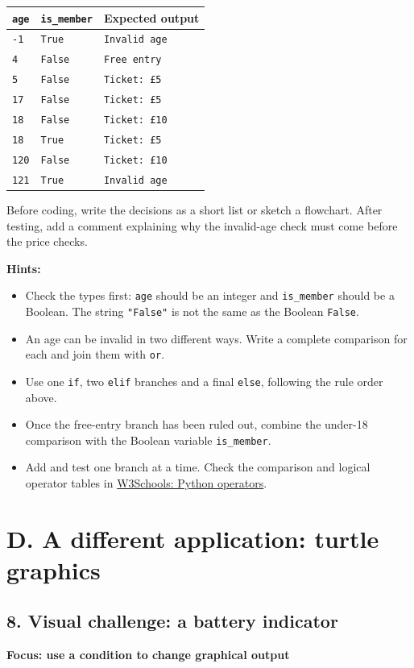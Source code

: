 \documentclass[12pt,a4paper]{article}
\begin{document}
\begingroup\small\renewcommand{\arraystretch}{1.3}\begin{longtable}{>{\raggedright\arraybackslash}p{}>{\raggedright\arraybackslash}p{}>{\raggedright\arraybackslash}p{}}
\toprule
\rowcolor{panel} \texttt{age} & \texttt{is\_member} & Expected output \\ \midrule\endhead
\texttt{-1} & \texttt{True} & \texttt{Invalid age} \\
\texttt{4} & \texttt{False} & \texttt{Free entry} \\
\texttt{5} & \texttt{False} & \texttt{Ticket: £5} \\
\texttt{17} & \texttt{False} & \texttt{Ticket: £5} \\
\texttt{18} & \texttt{False} & \texttt{Ticket: £10} \\
\texttt{18} & \texttt{True} & \texttt{Ticket: £5} \\
\texttt{120} & \texttt{False} & \texttt{Ticket: £10} \\
\texttt{121} & \texttt{True} & \texttt{Invalid age} \\
\bottomrule\end{longtable}\endgroup
Before coding, write the decisions as a short list or sketch a flowchart. After testing, add a comment explaining why the invalid-age check must come before the price checks.

\textbf{Hints:}

\begin{itemize}
\item Check the types first: \texttt{age} should be an integer and \texttt{is\_member} should be a Boolean. The string \texttt{"False"} is not the same as the Boolean \texttt{False}.
\item An age can be invalid in two different ways. Write a complete comparison for each and join them with \texttt{or}.
\item Use one \texttt{if}, two \texttt{elif} branches and a final \texttt{else}, following the rule order above.
\item Once the free-entry branch has been ruled out, combine the under-18 comparison with the Boolean variable \texttt{is\_member}.
\item Add and test one branch at a time. Check the comparison and logical operator tables in \href{https://www.w3schools.com/python/python_operators.asp}{W3Schools: Python operators}.
\end{itemize}
\section*{D. A different application: turtle graphics}
\subsection*{8. Visual challenge: a battery indicator}
\textbf{Focus: use a condition to change graphical output}
\end{document}
